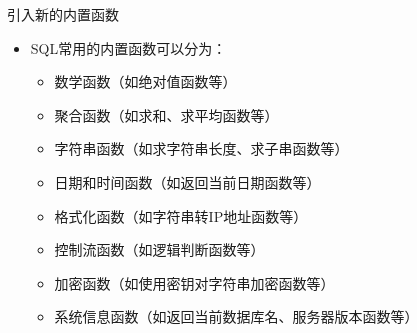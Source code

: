 \begin{frame}{引入新的内置函数}
    \begin{itemize}
        \item SQL常用的内置函数可以分为：
\begin{itemize}
    \item 数学函数（如绝对值函数等）
    \item 聚合函数（如求和、求平均函数等）
    \item 字符串函数（如求字符串长度、求子串函数等）
    \item 日期和时间函数（如返回当前日期函数等）
    \item 格式化函数（如字符串转IP地址函数等）
    \item 控制流函数（如逻辑判断函数等）
    \item 加密函数（如使用密钥对字符串加密函数等）
    \item 系统信息函数（如返回当前数据库名、服务器版本函数等）
\end{itemize}
    \end{itemize}
\end{frame}


